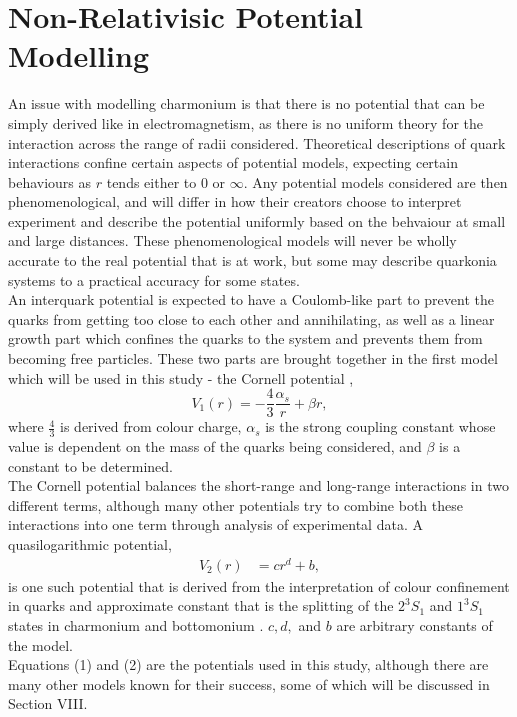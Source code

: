 \documentclass[10pt, twocolumn]{article}
\begin{document}
\section{Non-Relativisic Potential Modelling}
An issue with modelling charmonium is that there is no potential that can be simply derived like in electromagnetism, as there is no uniform theory for the interaction across the range of radii considered.
Theoretical descriptions of quark interactions confine certain aspects of potential models, expecting certain behaviours as $r$ tends either to $0$ or $\infty$.
Any potential models considered are then phenomenological, and will differ in how their creators choose to interpret experiment and describe the potential uniformly based on the behvaiour at small and large distances.
These phenomenological models will never be wholly accurate to the real potential that is at work, but some may describe quarkonia systems to a practical accuracy for some states.\\
An interquark potential is expected to have a Coulomb-like part to prevent the quarks from getting too close to each other and annihilating, as well as a linear growth part which confines the quarks to the system and prevents them from becoming free particles.
These two parts are brought together in the first model which will be used in this study - the Cornell potential \cite{3},
\begin{equation}
    V_1(r) = -\frac43\frac{\alpha_s}{r} + \beta r,
\end{equation}
where $\frac43$ is derived from colour charge, $\alpha_s$ is the strong coupling constant whose value is dependent on the mass of the quarks being considered, and $\beta$ is a constant to be determined. \\
The Cornell potential balances the short-range and long-range interactions in two different terms, although many other potentials try to combine both these interactions into one term through analysis of experimental data. 
A quasilogarithmic potential,
\begin{align}
    V_2(r) &= cr^d + b,
\end{align}
is one such potential that is derived from the interpretation of colour confinement in quarks and approximate constant that is the splitting of the $2^3S_1$ and $1^3S_1$ states in charmonium and bottomonium \cite{2}. 
$c,d,$ and $b$ are arbitrary constants of the model. \\
Equations (1) and (2) are the potentials used in this study, although there are many other models known for their success, some of which will be discussed in Section \RN{8}.
\end{document}
